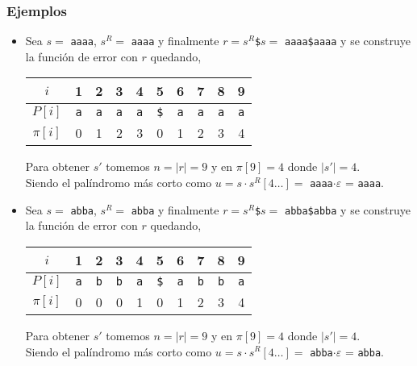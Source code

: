 \subsubsection{Ejemplos}
\begin{itemize}
\item Sea $s = $ \texttt{aaaa}, $s^R =$ \texttt{aaaa} y finalmente
$r = s^R$\texttt{\$}$s =$ \texttt{aaaa\$aaaa} y se construye la función de error con $r$ quedando,

\begin{table}[h]
\centering
\begin{tabular}{c|c|c|c|c|c|c|c|c|c|}
\cline{2-10}
$i$      & 1          & 2          & 3          & 4          & 5           & 6          & 7          & 8          & 9          \\ \hline
$P[i]$   & \texttt{a} & \texttt{a} & \texttt{a} & \texttt{a} & \texttt{\$} & \texttt{a} & \texttt{a} & \texttt{a} & \texttt{a} \\ \hline
$\pi[i]$ & 0          & 1          & 2          & 3          & 0           & 1          & 2          & 3          & 4          \\ \cline{2-10} 
\end{tabular}
\end{table}
Para obtener $s'$ tomemos $n = \vert r \vert = 9$ y en $\pi[9] = 4$ donde $\vert s' \vert = 4$.\\
Siendo el palíndromo más corto como
$u = s \cdot s^R[4 \ldots] =$ \texttt{aaaa}$\cdot \varepsilon$ = \texttt{aaaa}.

\item Sea $s = $ \texttt{abba}, $s^R =$ \texttt{abba} y finalmente
$r = s^R$\texttt{\$}$s =$ \texttt{abba\$abba} y se construye la función de error con $r$ quedando,

\begin{table}[h]
\centering
\begin{tabular}{c|c|c|c|c|c|c|c|c|c|}
\cline{2-10}
$i$      & 1          & 2          & 3          & 4          & 5           & 6          & 7          & 8          & 9          \\ \hline
$P[i]$   & \texttt{a} & \texttt{b} & \texttt{b} & \texttt{a} & \texttt{\$} & \texttt{a} & \texttt{b} & \texttt{b} & \texttt{a} \\ \hline
$\pi[i]$ & 0          & 0          & 0          & 1          & 0           & 1          & 2          & 3          & 4          \\ \cline{2-10} 
\end{tabular}
\end{table}
Para obtener $s'$ tomemos $n = \vert r \vert = 9$ y en $\pi[9] = 4$ donde $\vert s' \vert = 4$.\\
Siendo el palíndromo más corto como
$u = s \cdot s^R[4 \ldots] =$ \texttt{abba}$\cdot \varepsilon$ = \texttt{abba}.


\end{itemize}

